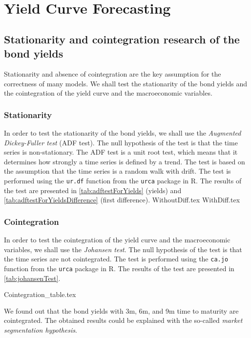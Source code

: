 \section{Yield Curve Forecasting}
    \subsection{Stationarity and cointegration research of the bond yields}
        Stationarity and absence of cointegration are the key assumption for the correctness of many models.
        We shall test the stationarity of the bond yields and the cointegration of the yield curve and the macroeconomic variables.
        \subsubsection{Stationarity}
            In order to test the stationarity of the bond yields, we shall use the \emph{Augmented Dickey-Fuller test} (ADF test).
            The null hypothesis of the test is that the time series is non-stationary.
            The ADF test is a unit root test, which means that it determines how strongly a time series is defined by a trend.
            The test is based on the assumption that the time series is a random walk with drift.
            The test is performed using the \texttt{ur.df} function from the \texttt{urca} package in R.
            The results of the test are presented in \cref{tab:adftestForYields} (yields) and \cref{tab:adftestForYieldsDifference} (first difference).
            {WithoutDiff.tex}
            {WithDiff.tex}

        \subsubsection{Cointegration}
            In order to test the cointegration of the yield curve and the macroeconomic variables, we shall use the
            \emph{Johansen test}. The null hypothesis of the test is that the time series are not cointegrated.
            The test is performed using the \texttt{ca.jo} function from the \texttt{urca} package in R.
            The results of the test are presented in \cref{tab:johansenTest}.    

            {Cointegration_table.tex}

            We found out that the bond yields with 3m, 6m, and 9m time to maturity are cointegrated. The obtained results could 
            be explained with the so-called \emph{market segmentation hypothesis}. 
            
